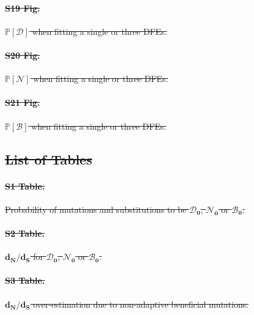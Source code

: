 \documentclass[10pt,letterpaper]{article}
\newcommand{\proba}{\mathbb{P}}
\newcommand{\dn}{d_N}
\newcommand{\ds}{d_S}
\newcommand{\dnds}{\dn / \ds}
\newcommand{\SphyDel}{\mathcal{D}_0}
\newcommand{\SphyNeu}{\mathcal{N}_0}
\newcommand{\SphyBen}{\mathcal{B}_0}
\newcommand{\SpopDel}{\mathcal{D}}
\newcommand{\SpopNeu}{\mathcal{N}}
\newcommand{\SpopBen}{\mathcal{B}}
\providecommand{\DIFdeltex}[1]{{\protect\color{red}\sout{#1}}}                      %
\providecommand{\DIFdel}[1]{\texorpdfstring{\DIFdeltex{#1}}{}} %
\begin{document}
\paragraph*{\DIFdel{S19 Fig.}}
\DIFdel{$\bm{\proba [ \SpopDel ]}$ when fitting a single or three DFEs.}%

\paragraph*{\DIFdel{S20 Fig.}}
\DIFdel{$\bm{\proba [ \SpopNeu ]}$ when fitting a single or three DFEs.}%

\paragraph*{\DIFdel{S21 Fig.}}
\DIFdel{$\bm{\proba [ \SpopBen ]}$ when fitting a single or three DFEs.}%

\subsection*{\DIFdel{List of Tables}}
\paragraph*{\DIFdel{S1 Table.}}
\DIFdel{Probability of mutations and substitutions to be $\bm{\SphyDel}$, $\bm{\SphyNeu}$ or $\bm{\SphyBen}$.}%

\paragraph*{\DIFdel{S2 Table.}}
\DIFdel{$\bm{\dnds}$ for $\bm{\SphyDel}$, $\bm{\SphyNeu}$ or $\bm{\SphyBen}$.}%

\paragraph*{\DIFdel{S3 Table.}}
\DIFdel{$\bm{\dnds}$ over-estimation due to non-adaptive beneficial mutations.}%
\end{document}
